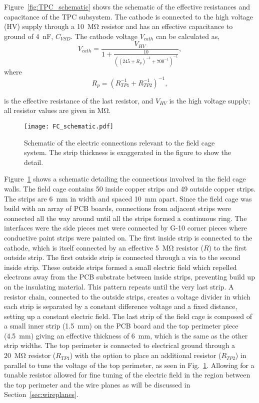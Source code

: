 Figure~\ref{fig:TPC_schematic} shows the schematic of the effective resistances and capacitance of the TPC subsystem. The cathode is connected to the high voltage (HV) supply through a \SI{10}{\mega\ohm} resistor and has an effective capacitance to ground of \SI{4}{\nano\farad}, $C_{VSD}$. The cathode voltage $V_{cath}$ can be calculated as,
\begin{equation}
V_{cath} = \frac{V_{HV}}{ 1 + \frac{10}{ \left( (245 + R_p)^{-1} + 700^{-1} \right)^{-1} } },
\end{equation}
where 
\begin{equation}
R_p = \left( R_{TP1}^{-1} + R_{TP2}^{-1} \right)^{-1},
 \label{eq:Reff}
\end{equation} 

is the effective resistance of the last resistor, and $V_{HV}$ is the high voltage supply; all resistor values are given in \si{\mega\ohm}.


\begin{figure}[!htb]
\centering
\texttt{[image: FC\_schematic.pdf]}
\caption{Schematic of the electric connections relevant to the field cage system. The strip thickness is exaggerated in the figure to show the detail.}
\label{fig:FC_schematic}
\end{figure}

Figure~\ref{fig:FC_schematic} shows a schematic detailing the connections involved in the field cage walls. The field cage contains 50 inside copper strips and 49 outside copper strips. The strips are \SI{6}{\milli\metre} in width and spaced \SI{10}{\milli\metre} apart. Since the field cage was build with an array of PCB boards, connections from adjacent strips were connected all the way around until all the strips formed a continuous ring. The interfaces were the side pieces met were connected by G-10 corner pieces where conductive paint strips were painted on. The first inside strip is connected to the cathode, which is itself connected by an effective \SI{5}{\mega\ohm} resistor ($R$) to the first outside strip. The first outside strip is connected through a via to the second inside strip. These outside strips formed a small electric field which repelled electrons away from the PCB substrate between inside strips, preventing build up on the insulating material. This pattern repeats until the very last strip. A resistor chain, connected to the outside strips, creates a voltage divider in which each strip is separated by a constant difference voltage and a fixed distance, setting up a constant electric field. The last strip of the field cage is composed of a small inner strip  (\SI{1.5}{\milli\metre}) on the PCB board and the top perimeter piece (\SI{4.5}{\milli\metre}) giving an  effective thickness of \SI{6}{\milli\metre}, which is the same as the other strip widths. The top perimeter is connected to electrical ground through a \SI{20}{\mega\ohm} resistor ($R_{TP1}$) with the option to place an additional resistor ($R_{TP2}$) in parallel to tune the voltage of the top perimeter, as seen in Fig.~\ref{fig:FC_schematic}. Allowing for a tunable resistor allowed for fine tuning of the electric field in the region between the top perimeter and the wire planes as will be discussed in Section~\ref{sec:wireplanes}. 

